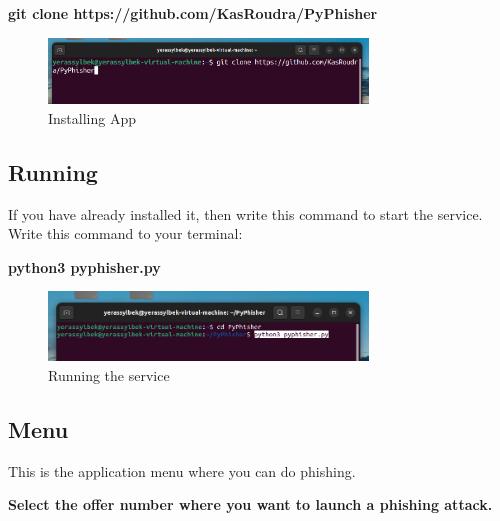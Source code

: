 \documentclass[conference]{IEEEtran}
\begin{document}
\textbf{git clone https://github.com/KasRoudra/PyPhisher}

\begin{figure}[htbp]
\centerline{
\includegraphics[width=85mm]{installation.png}
}
\caption{Installing App}
\label{fig}
\end{figure}

\subsection{Running}
If you have already installed it, then write this command to start the service.
Write this command to your terminal: 

\textbf{python3 pyphisher.py}

\begin{figure}[htbp]
\centerline{
\includegraphics[width=85mm]{running.png}
}
\caption{Running the service}
\label{fig}
\end{figure}

\subsection{Menu}
This is the application menu where you can do phishing.


\textbf{
Select the offer number where you want to launch a phishing attack.}
\end{document}

